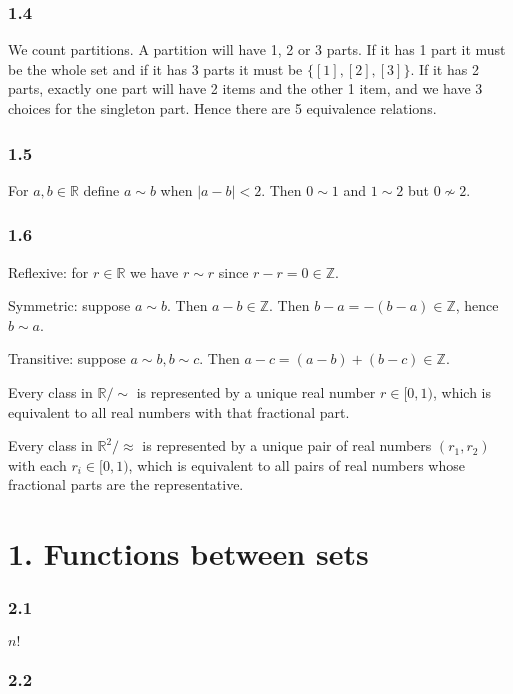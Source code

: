 \documentclass{article}
\def\R{\mathbb{R}}
\def\Z{\mathbb{Z}}
\begin{document}
\subsubsection*{1.4}

We count partitions. A partition will have 1, 2 or 3 parts. If it has 1 part it must be the whole set and if it has 3 parts it must be $\{[1], [2], [3]\}$. If it has 2 parts, exactly one part will have 2 items and the other 1 item, and we have 3 choices for the singleton part. Hence there are 5 equivalence relations.

\subsubsection*{1.5}

For $a, b \in \R$ define $a \sim b$ when $|a - b| < 2$. Then $0 \sim 1$ and $1 \sim 2$ but $0 \not\sim 2$.

\subsubsection*{1.6}

Reflexive: for $r \in \R$ we have $r \sim r$ since $r - r = 0 \in \Z$.

Symmetric: suppose $a \sim b$. Then $a - b \in \Z$. Then $b - a = -(b - a) \in \Z$, hence $b \sim a$.

Transitive: suppose $a \sim b, b \sim c$. Then $a - c = (a - b) + (b - c) \in \Z$.

Every class in $\R / \sim$ is represented by a unique real number $r \in [0, 1)$, which is equivalent to all real numbers with that fractional part.

Every class in $\R^2 / \approx$ is represented by a unique pair of real numbers $(r_1, r_2)$ with each $r_i \in [0, 1)$, which is equivalent to all pairs of real numbers whose fractional parts are the representative.

\section*{1. Functions between sets}

\subsubsection*{2.1}

$n!$

\subsubsection*{2.2}
\end{document}
